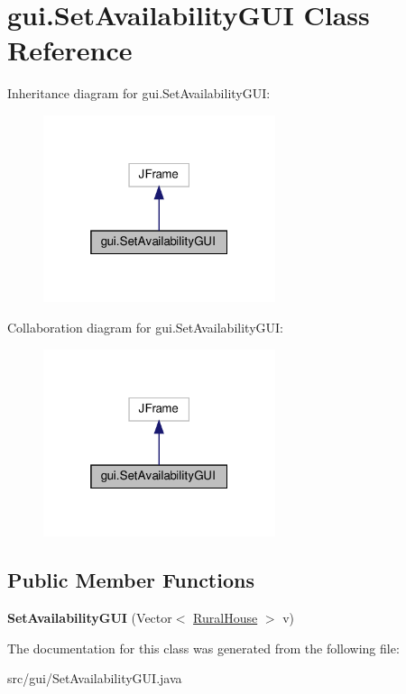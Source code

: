 \hypertarget{classgui_1_1_set_availability_g_u_i}{}\section{gui.\+Set\+Availability\+G\+UI Class Reference}
\label{classgui_1_1_set_availability_g_u_i}


Inheritance diagram for gui.\+Set\+Availability\+G\+UI\+:
\nopagebreak
\begin{figure}[H]
\begin{center}
\leavevmode
\includegraphics[width=193pt]{classgui_1_1_set_availability_g_u_i__inherit__graph}
\end{center}
\end{figure}


Collaboration diagram for gui.\+Set\+Availability\+G\+UI\+:
\nopagebreak
\begin{figure}[H]
\begin{center}
\leavevmode
\includegraphics[width=193pt]{classgui_1_1_set_availability_g_u_i__coll__graph}
\end{center}
\end{figure}
\subsection*{Public Member Functions}
\begin{DoxyCompactItemize}
\item 
\mbox{\label{classgui_1_1_set_availability_g_u_i_a947ee30efd2f471ecb843ed8d88b5bbb}} 
{\bfseries Set\+Availability\+G\+UI} (Vector$<$ \mbox{\hyperlink{classdomain_1_1_rural_house}{Rural\+House}} $>$ v)
\end{DoxyCompactItemize}


The documentation for this class was generated from the following file\+:\begin{DoxyCompactItemize}
\item 
src/gui/Set\+Availability\+G\+U\+I.\+java\end{DoxyCompactItemize}
